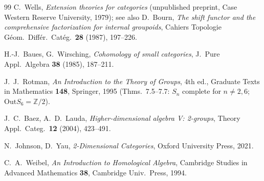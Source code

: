 \documentclass[11pt]{article}
\theoremstyle{definition}
\newcommand{\Z}{\mathbb{Z}}
\newcommand{\Out}{\mathrm{Out}}
\begin{document}
\begin{thebibliography}{99}
C.~Wells,
\emph{Extension theories for categories} (unpublished preprint, Case Western Reserve University,
1979); see also
D.~Bourn, \emph{The shift functor and the comprehensive factorization for internal groupoids},
Cahiers Topologie G\'eom.\ Diff\'er.\ Cat\'eg.\ \textbf{28} (1987), 197--226.

H.-J.~Baues, G.~Wirsching,
\emph{Cohomology of small categories},
J.\ Pure Appl.\ Algebra \textbf{38} (1985), 187--211.

J.~J.~Rotman,
\emph{An Introduction to the Theory of Groups}, 4th ed.,
Graduate Texts in Mathematics \textbf{148}, Springer, 1995 (Thms.\ 7.5--7.7: $S_n$ complete for
$n\ne2,6$; $\Out S_6=\Z/2$).

J.~C.~Baez, A.~D.~Lauda,
\emph{Higher-dimensional algebra V: 2-groups},
Theory Appl.\ Categ.\ \textbf{12} (2004), 423--491.

N.~Johnson, D.~Yau,
\emph{2-Dimensional Categories},
Oxford University Press, 2021.

C.~A.~Weibel,
\emph{An Introduction to Homological Algebra},
Cambridge Studies in Advanced Mathematics \textbf{38}, Cambridge Univ.\ Press, 1994.

\end{thebibliography}
\end{document}

